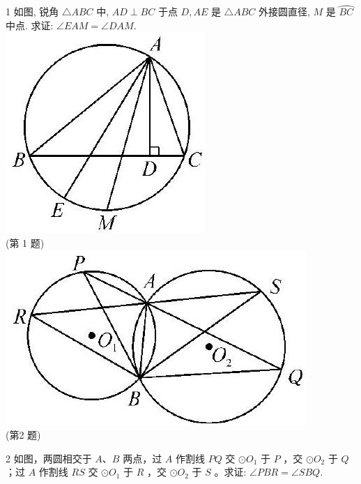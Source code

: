 \documentclass[10pt]{article}
\begin{document}
1 如图, 锐角 $\triangle A B C$ 中, $A D \perp B C$ 于点 $D, A E$ 是 $\triangle A B C$ 外接圆直径, $M$ 是 $\overparen{B C}$ 中点. 求证: $\angle E A M=\angle D A M$.\\
\includegraphics[max width=\textwidth, center]{2024_10_30_66b8e5e701da2093c133g-026(3)}\\
(第 1 题)\\
\includegraphics[max width=\textwidth, center]{2024_10_30_66b8e5e701da2093c133g-026(2)}\\
(第2 题)

2 如图，两圆相交于 $A 、 B$ 两点，过 $A$ 作割线 $P Q$ 交 $\odot O_{1}$ 于 $P$ ，交 $\odot O_{2}$ 于 $Q$ ；过 $A$ 作割线 $R S$ 交 $\odot O_{1}$ 于 $R$ ，交 $\odot O_{2}$ 于 $S$ 。求证: $\angle P B R=\angle S B Q$.
\end{document}
